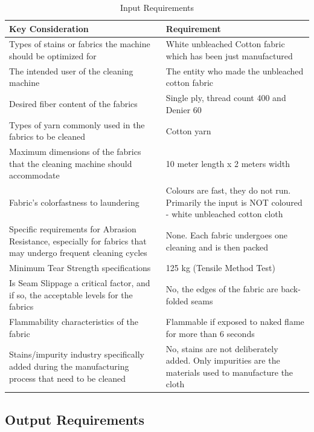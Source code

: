 \documentclass[12pt]{article} %
\begin{document}
\begin{table}[h]
\centering
\begin{tabular}{ |p{7.5cm}|p{7.5cm}| }

\hline
\textbf{Key Consideration} & \textbf{Requirement} \\
\hline
Types of stains or fabrics the machine should be optimized for & White unbleached Cotton fabric which has been just manufactured \\
\hline
The intended user of the cleaning machine & The entity who made the unbleached cotton fabric \\
\hline
Desired fiber content of the fabrics & Single ply, \gls{thread count} 400 and \gls{Denier} 60 \\
\hline
Types of yarn commonly used in the fabrics to be cleaned & Cotton yarn \\
\hline
Maximum dimensions of the fabrics that the cleaning machine should accommodate & 10 meter length x 2 meters width \\
\hline
Fabric's colorfastness\index{colorfastness} to laundering & Colours are fast, they do not run. Primarily the input is NOT coloured - white unbleached cotton cloth \\
\hline
Specific requirements for \gls{Abrasion Resistance}, especially for fabrics that may undergo frequent cleaning cycles & None. Each fabric undergoes one cleaning and is then packed \\
\hline
Minimum \gls{Tear Strength} specifications & 125 kg (\gls{Tensile Method Test}) \\
\hline
Is \gls{Seam Slippage} a critical factor, and if so, the acceptable levels for the fabrics & No, the edges of the fabric are \gls{back-folded seams} \\
\hline
Flammability\index{flammability} characteristics of the fabric & Flammable if exposed to naked flame for more than 6 seconds\\
\hline
Stains/impurity industry specifically added during the manufacturing process that need to be cleaned & No, stains are not deliberately added. Only impurities are the materials used to manufacture the cloth \\
\hline
\end{tabular}
\caption{Input Requirements}
\label{table:your_label}
\end{table}

\subsection{Output Requirements}
\end{document}
